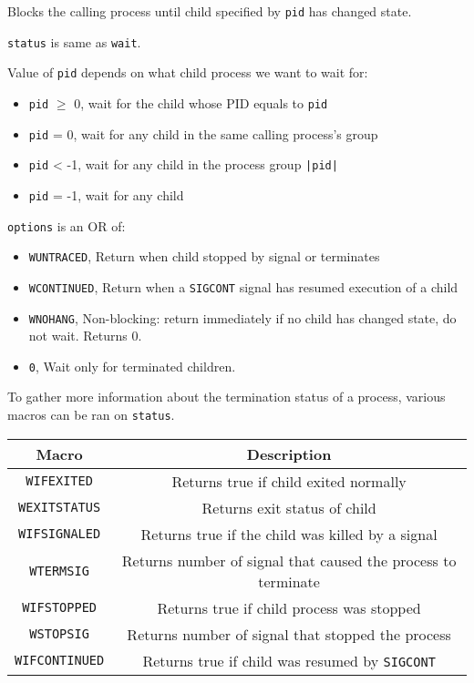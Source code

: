 \documentclass{article}
\begin{document}
Blocks the calling process until child specified by \texttt{pid} has changed state.

\texttt{status} is same as \texttt{wait}.

Value of \texttt{pid} depends on what child process we want to wait for:

\begin{itemize}
    \item \texttt{pid} $\ge$ 0, wait for the child whose PID equals to \texttt{pid}
    \item \texttt{pid} = 0, wait for any child in the same calling process's group
    \item \texttt{pid} < -1, wait for any child in the process group \texttt{|pid|}
    \item \texttt{pid} = -1, wait for any child
\end{itemize}

\texttt{options} is an OR of:

\begin{itemize}
    \item \texttt{WUNTRACED}, Return when child stopped by signal or terminates
    \item \texttt{WCONTINUED}, Return when a \texttt{SIGCONT} signal has resumed execution of a child
    \item \texttt{WNOHANG}, Non-blocking: return immediately if no child has changed state, do not wait. Returns 0.
    \item \texttt{0}, Wait only for terminated children.
\end{itemize}

To gather more information about the termination status of a process, various macros can be ran on \texttt{status}.


\begin{center}
\begin{tabular}{ |c|c| }
    \hline \textbf{Macro} & \textbf{Description} \\
    \hline
    \texttt{WIFEXITED} & Returns true if child exited normally \\
    \texttt{WEXITSTATUS} & Returns exit status of child \\
    \texttt{WIFSIGNALED} & Returns true if the child was killed by a signal \\
    \texttt{WTERMSIG} & Returns number of signal that caused the process to terminate \\
    \texttt{WIFSTOPPED} & Returns true if child process was stopped \\
    \texttt{WSTOPSIG} & Returns number of signal that stopped the process \\
    \texttt{WIFCONTINUED} & Returns true if child was resumed by \texttt{SIGCONT} \\
    \hline 
\end{tabular}
\end{center}
\end{document}
